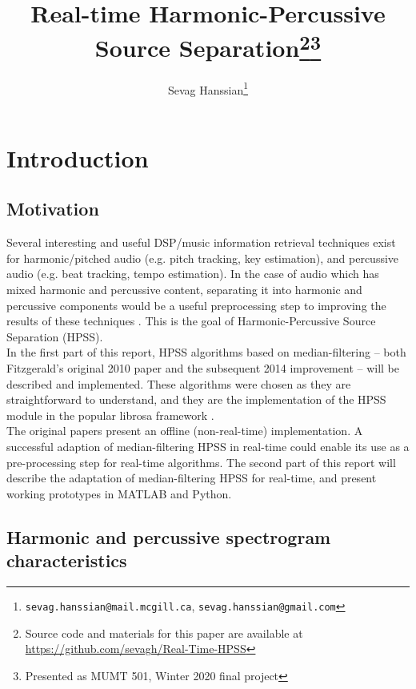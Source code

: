 \documentclass[letter,12pt]{article}
\title{Real-time Harmonic-Percussive Source Separation\thanks{Source code and materials for this paper are available at \url{https://github.com/sevagh/Real-Time-HPSS}}\thanks{Presented as MUMT 501, Winter 2020 final project}}
\author{Sevag Hanssian\thanks{\texttt{sevag.hanssian@mail.mcgill.ca}, \texttt{sevag.hanssian@gmail.com}}}
\begin{document}
\maketitle

\vfill
\clearpage %

\tableofcontents

\vfill
\clearpage %

\listoffigures

\listoflistings

\vfill
\clearpage %

\section{Introduction}

\subsection{Motivation}

Several interesting and useful DSP/music information retrieval techniques exist for harmonic/pitched audio (e.g. pitch tracking, key estimation), and percussive audio (e.g. beat tracking, tempo estimation). In the case of audio which has mixed harmonic and percussive content, separating it into harmonic and percussive components would be a useful preprocessing step to improving the results of these techniques \cite{whyhpss}. This is the goal of Harmonic-Percussive Source Separation (HPSS).\\

In the first part of this report, HPSS algorithms based on median-filtering -- both Fitzgerald's original 2010 paper \cite{fitzgerald} and the subsequent 2014 improvement \cite{driedger} -- will be described and implemented. These algorithms were chosen as they are straightforward to understand, and they are the implementation of the HPSS module in the popular librosa framework \cite{librosa}.\\

The original papers present an offline (non-real-time) implementation. A successful adaption of median-filtering HPSS in real-time could enable its use as a pre-processing step for real-time algorithms. The second part of this report will describe the adaptation of median-filtering HPSS for real-time, and present working prototypes in MATLAB and Python.

\subsection{Harmonic and percussive spectrogram characteristics}
\end{document}
